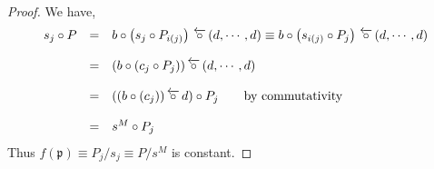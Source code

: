 \documentclass[leqno]{article}
\newcommand{\circleftarrow}{\,\overleftarrow{\circ}\,}
\numberwithin{equation}{section}
\begin{document}
\begin{proof}
				We have, 
				\begin{equation*}
								\begin{array}[H]{lll}
												s_{j}\circ P &=&  b\circ \left( s_{j}\circ P_{i(j)}
												\right)\circleftarrow (d,\cdots , d)\equiv  b\circ \left(
												s_{i(j)}\circ P_{j} \right)\circleftarrow (d,\cdots , d) \\\\
												&=& (b\circ (c_{j}\circ P_{j}))\circleftarrow (d,\cdots , d) \\\\
												&=& ((b\circ(c_{j}))\circleftarrow d)\circ P_{j}\qquad
												\text{by commutativity} \\\\
												&=& s^{M}\circ P_{j}
								\end{array}
				\end{equation*}
				Thus $f(\mathfrak{p})\equiv P_{j}/s_{j}\equiv P/s^{M}$ is constant. 
\end{proof}
\end{document}
